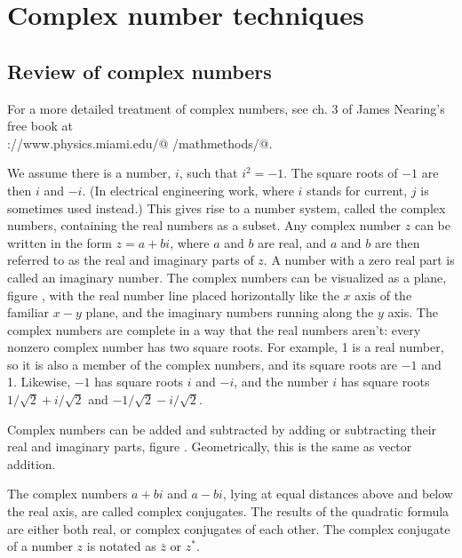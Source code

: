 \chapter{Complex number techniques}

\section{Review of complex numbers}

For a more detailed treatment of complex numbers, see ch. 3 of
James Nearing's free book at \\
\verb@http://www.physics.miami.edu/@
\verb@nearing/mathmethods/@.
%
%
%

We assume there is a number, $i$, such that $i^2=-1$.
The square roots of $-1$ are then $i$ and $-i$. (In electrical engineering work,
where $i$ stands for current, $j$ is sometimes used instead.) This gives rise
to a number system, called the complex numbers, containing the real numbers as a subset.
Any complex number $z$ can be written in the form $z=a+bi$, where $a$ and $b$ are
real, and $a$ and $b$ are then referred to as the real and imaginary parts of $z$.
A number with a zero real part is called an imaginary number.
The complex numbers can be visualized as a plane, figure , with the real number line placed
horizontally like the $x$ axis of the familiar $x-y$ plane, and the imaginary numbers running
along the $y$ axis. The complex numbers are complete in a way that the real numbers
aren't: every nonzero complex number has two square roots. For example, 1 is
a real number, so it is also a member of the complex numbers, and its square roots
are $-1$ and 1. Likewise, $-1$ has square roots $i$ and $-i$, and the number $i$
has square roots $1/\sqrt{2}+i/\sqrt{2}$ and $-1/\sqrt{2}-i/\sqrt{2}$.

Complex numbers can be added and subtracted by adding or subtracting their real
and imaginary parts, figure . Geometrically, this is the same as vector addition.

The complex numbers $a+bi$ and $a-bi$, lying at equal distances above and below the
real axis, are called complex conjugates.
The results of the quadratic formula
are either both real, or complex conjugates of each other.
The complex conjugate of a number $z$ is notated as $\bar{z}$ or
$z^*$.

